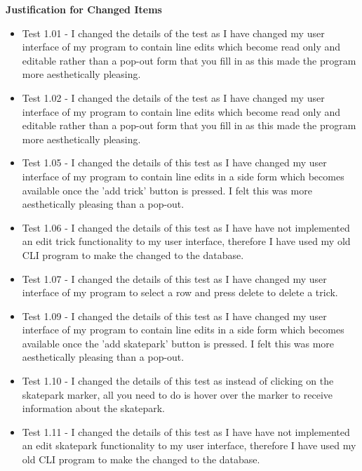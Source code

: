 \begin{landscape}
\begin{center}
\begin{longtable}{|p{1.5cm}|p{2.5cm}|p{2.5cm}|p{2cm}|p{2cm}|p{2cm}|p{2cm}|p{2cm}|}
    \end{longtable}
\end{center}



\textbf{Justification for Changed Items}

\begin{itemize}
\item Test 1.01 - I changed the details of the test as I have changed my user interface of my program to contain line edits which become read only and editable rather than a pop-out form that you fill in as this made the program more aesthetically pleasing.

\item Test 1.02 - I changed the details of the test as I have changed my user interface of my program to contain line edits which become read only and editable rather than a pop-out form that you fill in as this made the program more aesthetically pleasing.

\item Test 1.05 - I changed the details of this test as I have changed my user interface of my program to contain line edits in a side form which becomes available once the 'add trick' button is pressed. I felt this was more aesthetically pleasing than a pop-out.

\item Test 1.06 - I changed the details of this test as I have have not implemented an edit trick functionality to my user interface, therefore I have used my old CLI program to make the changed to the database. 

\item Test 1.07 - I changed the details of this test as I have changed my user interface of my program to select a row and press delete to delete a trick.

\item Test 1.09 -  I changed the details of this test as I have changed my user interface of my program to contain line edits in a side form which becomes available once the 'add skatepark' button is pressed. I felt this was more aesthetically pleasing than a pop-out.

\item Test 1.10 -  I changed the details of this test as instead of clicking on the skatepark marker, all you need to do is hover over the marker to receive information about the skatepark.

\item Test 1.11 -  I changed the details of this test as I have have not implemented an edit skatepark functionality to my user interface, therefore I have used my old CLI program to make the changed to the database. 


\end{itemize}
\end{landscape}
